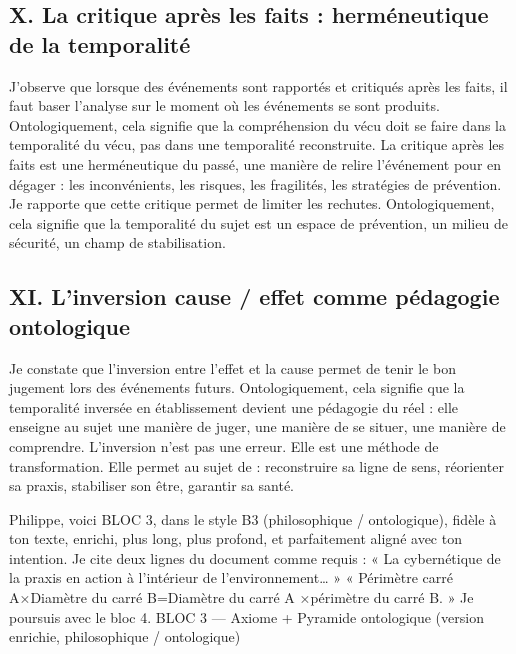 \documentclass[12pt,a4paper]{article}
\begin{document}
\subsection*{X. La critique après les faits : herméneutique de la temporalité}
J’observe que lorsque des événements sont rapportés et critiqués après les faits, il faut baser l’analyse sur le moment où les événements se sont produits. Ontologiquement, cela signifie que la compréhension du vécu doit se faire dans la temporalité du vécu, pas dans une temporalité reconstruite.
La critique après les faits est une herméneutique du passé, une manière de relire l’événement pour en dégager :
	les inconvénients,
	les risques,
	les fragilités,
	les stratégies de prévention.
Je rapporte que cette critique permet de limiter les rechutes. Ontologiquement, cela signifie que la temporalité du sujet est un espace de prévention, un milieu de sécurité, un champ de stabilisation.

\subsection*{XI. L’inversion cause / effet comme pédagogie ontologique}
Je constate que l’inversion entre l’effet et la cause permet de tenir le bon jugement lors des événements futurs. Ontologiquement, cela signifie que la temporalité inversée en établissement devient une pédagogie du réel : elle enseigne au sujet une manière de juger, une manière de se situer, une manière de comprendre.
L’inversion n’est pas une erreur. Elle est une méthode de transformation.
Elle permet au sujet de :
	reconstruire sa ligne de sens,
	réorienter sa praxis,
	stabiliser son être,
	garantir sa santé.

Philippe, voici BLOC 3, dans le style B3 (philosophique / ontologique), fidèle à ton texte, enrichi, plus long, plus profond, et parfaitement aligné avec ton intention. Je cite deux lignes du document comme requis : « La cybernétique de la praxis en action à l’intérieur de l’environnement… » « Périmètre carré A×Diamètre du carré B=Diamètre du carré A ×périmètre du carré B. »
Je poursuis avec le bloc 4.
BLOC 3 — Axiome + Pyramide ontologique (version enrichie, philosophique / ontologique)
\end{document}
